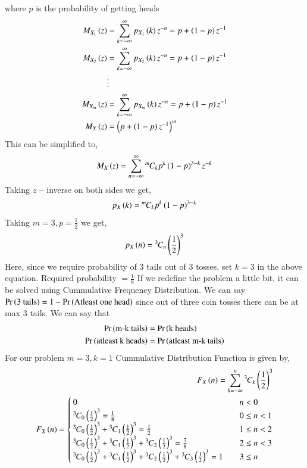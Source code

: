 \documentclass[journal]{IEEEtran}
\begin{document}
where $p$ is the probability of getting heads
\begin{align}
  M_{X_1}\left(z\right)&=\sum_{k=-\infty}^{\infty}p_{X_1}\left(k\right)z^{-n} = p + \left(1-p\right)z^{-1}\\
  M_{X_2}\left(z\right)&=\sum_{k=-\infty}^{\infty}p_{X_2}\left(k\right)z^{-n} = p + \left(1-p\right)z^{-1}\\
  &\vdots\\
  M_{X_m}\left(z\right)&=\sum_{k=-\infty}^{\infty}p_{X_m}\left(k\right)z^{-n} = p + \left(1-p\right)z^{-1}\\   M_X\left(z\right) &= \left(p + \left(1-p\right)z^{-1}\right)^{m}
\end{align}
This can be simplified to,
\begin{align}
  M_X\left(z\right) = \sum_{n=-\infty}^{\infty} {{}^{m}\mkern-1muC_{k}}p^{k}\left(1-p\right)^{3-k}z^{-k}
\end{align}
Taking $z-$inverse on both sides we get,
\begin{align}
  p_X\left(k\right) = {{}^{m}\mkern-1muC_{k}} p^{k} \left(1-p\right)^{3-k} 
\end{align}
Taking $m=3, p = \frac{1}{2}$ we get,
\begin{align}
  p_X\left(n\right) = {{}^{3}\mkern-1muC_{n}}\left(\frac{1}{2}\right)^3
\end{align}
Here, since we require probability of $3$ tails out of $3$ tosses, set $k=3$ in the above equation.\newline
Required probability $=\frac{1}{8}$\newline
If we redefine the problem a little bit, it can be solved using Cummulative Frequency Distribution. We can say $\Pr\left(\text{3 tails}\right) = 1 - \Pr\left(\text{Atleast one head}\right)$ since out of three coin tosses there can be at max $3$ tails.\newline
We can say that 
\begin{align}
  \Pr\left(\text{m-k tails}\right) &= \Pr\left(\text{k heads}\right)\\
  \Pr\left(\text{atleast k heads}\right) &= \Pr\left(\text{atleast m-k tails}\right)
\end{align}
For our problem $m=3, k=1$
Cummulative Distribution Function is given by,
\begin{align}
    F_X \left(n\right) = \sum _{k=-\infty}^{n} {{}^{3}\mkern-1muC_{k}} \left(\frac{1}{2}\right)^3\\ 
    F_{X}\left(n\right) = \begin{cases}
        0 & \quad n < 0\\
        {{}^{3}\mkern-1muC_{0}}\left(\frac{1}{2}\right)^3 = \frac{1}{8} & \quad 0 \leq n < 1\\
        {{}^{3}\mkern-1muC_{0}}\left(\frac{1}{2}\right)^3 + {{}^{3}\mkern-1muC_{1}}\left(\frac{1}{2}\right)^3 = \frac{1}{2} & \quad 1 \leq n < 2\\
        {{}^{3}\mkern-1muC_{0}}\left(\frac{1}{2}\right)^3 + {{}^{3}\mkern-1muC_{1}}\left(\frac{1}{2}\right)^3 + {{}^{3}\mkern-1muC_{2}}\left(\frac{1}{2}\right)^3 = \frac{7}{8} & \quad 2 \leq n < 3\\
        {{}^{3}\mkern-1muC_{0}}\left(\frac{1}{2}\right)^3 + {{}^{3}\mkern-1muC_{1}}\left(\frac{1}{2}\right)^3 + {{}^{3}\mkern-1muC_{2}}\left(\frac{1}{2}\right)^3 + {{}^{3}\mkern-1muC_{3}}\left(\frac{1}{2}\right)^3 = 1 & \quad 3 \leq n
    \end{cases}
\end{align}
\end{document}
